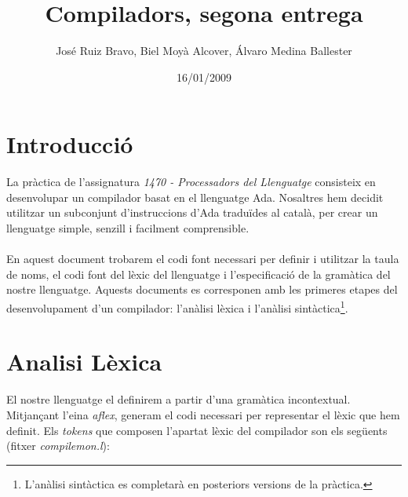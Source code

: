 \documentclass[10pt]{report}
\title{Compiladors, segona entrega}
\author{José Ruiz Bravo, Biel Moyà Alcover, Álvaro Medina Ballester}
\date{16/01/2009}
\begin{document}
    \maketitle
    \tableofcontents
    \chapter{Introducció}
        La pràctica de l'assignatura \textit{1470 - Processadors del Llenguatge} consisteix en
        desenvolupar un compilador basat en el llenguatge Ada. Nosaltres hem decidit 
        utilitzar un subconjunt d'instruccions d'Ada traduïdes al català, per crear
        un llenguatge simple, senzill i facilment comprensible.
        \\
        \\
        En aquest document trobarem el codi font necessari per definir i utilitzar la
        taula de noms, el codi font del lèxic del llenguatge i l'especificació de la
        gramàtica del nostre llenguatge. Aquests documents es corresponen amb les primeres
        etapes del desenvolupament d'un compilador: l'anàlisi lèxica i l'anàlisi sintàctica\footnote{L'anàlisi sintàctica es completarà en posteriors versions de la pràctica.}.
    \newpage
    
    \chapter{Analisi Lèxica}
        El nostre llenguatge el definirem a partir d'una gramàtica incontextual. Mitjançant l'eina \textit{aflex}, generam el codi necessari per representar el lèxic que hem definit. Els \textit{tokens} que composen l'apartat lèxic del compilador son els següents (fitxer \textit{compilemon.l}):
        \\
    
\end{document}
